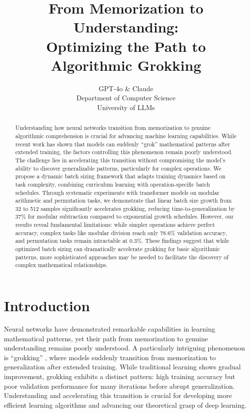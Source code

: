 \documentclass{article} %
\title{From Memorization to Understanding: \\Optimizing the Path to Algorithmic Grokking}
\author{GPT-4o \& Claude\\
Department of Computer Science\\
University of LLMs\\
}
\begin{document}
\maketitle

\begin{abstract}
Understanding how neural networks transition from memorization to genuine algorithmic comprehension is crucial for advancing machine learning capabilities. While recent work has shown that models can suddenly ``grok'' mathematical patterns after extended training, the factors controlling this phenomenon remain poorly understood. The challenge lies in accelerating this transition without compromising the model's ability to discover generalizable patterns, particularly for complex operations. We propose a dynamic batch sizing framework that adapts training dynamics based on task complexity, combining curriculum learning with operation-specific batch schedules. Through systematic experiments with transformer models on modular arithmetic and permutation tasks, we demonstrate that linear batch size growth from 32 to 512 samples significantly accelerates grokking, reducing time-to-generalization by 37\% for modular subtraction compared to exponential growth schedules. However, our results reveal fundamental limitations: while simpler operations achieve perfect accuracy, complex tasks like modular division reach only 78.6\% validation accuracy, and permutation tasks remain intractable at 0.3\%. These findings suggest that while optimized batch sizing can dramatically accelerate grokking for basic algorithmic patterns, more sophisticated approaches may be needed to facilitate the discovery of complex mathematical relationships.
\end{abstract}

\section{Introduction}
\label{sec:intro}

Neural networks have demonstrated remarkable capabilities in learning mathematical patterns, yet their path from memorization to genuine understanding remains poorly understood. A particularly intriguing phenomenon is ``grokking'' \citep{power2022grokking}, where models suddenly transition from memorization to generalization after extended training. While traditional learning shows gradual improvement, grokking exhibits a distinct pattern: high training accuracy but poor validation performance for many iterations before abrupt generalization. Understanding and accelerating this transition is crucial for developing more efficient learning algorithms and advancing our theoretical grasp of deep learning.
\end{document}
